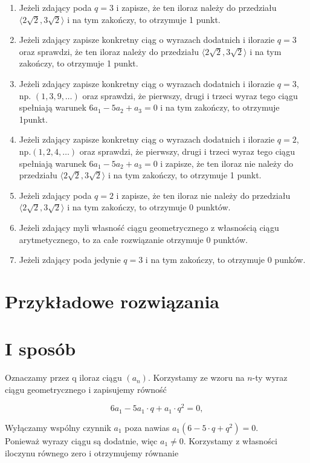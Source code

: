 \documentclass[10pt]{article}
\begin{document}
\begin{enumerate}
  \item Jeżeli zdający poda $q=3$ i zapisze, że ten iloraz należy do przedziału $\langle 2 \sqrt{2}, 3 \sqrt{2}\rangle$ i na tym zakończy, to otrzymuje 1 punkt.
  \item Jeżeli zdający zapisze konkretny ciąg o wyrazach dodatnich i ilorazie $q=3$ oraz sprawdzi, że ten iloraz należy do przedziału $\langle 2 \sqrt{2}, 3 \sqrt{2}\rangle$ i na tym zakończy, to otrzymuje 1 punkt.
  \item Jeżeli zdający zapisze konkretny ciąg o wyrazach dodatnich i ilorazie $q=3$, np. $(1,3,9, \ldots)$ oraz sprawdzi, że pierwszy, drugi i trzeci wyraz tego ciągu spełniają warunek $6 a_{1}-5 a_{2}+a_{3}=0$ i na tym zakończy, to otrzymuje 1punkt.
  \item Jeżeli zdający zapisze konkretny ciąg o wyrazach dodatnich i ilorazie $q=2$, $\mathrm{np} .(1,2,4, \ldots)$ oraz sprawdzi, że pierwszy, drugi i trzeci wyraz tego ciągu spełniają warunek $6 a_{1}-5 a_{2}+a_{3}=0$ i zapisze, że ten iloraz nie należy do przedziału $\langle 2 \sqrt{2}, 3 \sqrt{2}\rangle$ i na tym zakończy, to otrzymuje 1 punkt.
  \item Jeżeli zdający poda $q=2$ i zapisze, że ten iloraz nie należy do przedziału $\langle 2 \sqrt{2}, 3 \sqrt{2}\rangle$ i na tym zakończy, to otrzymuje 0 punktów.
  \item Jeżeli zdający myli własność ciągu geometrycznego z własnością ciągu arytmetycznego, to za całe rozwiązanie otrzymuje 0 punktów.
  \item Jeżeli zdający poda jedynie $q=3$ i na tym zakończy, to otrzymuje 0 punków.
\end{enumerate}

\section*{Przykładowe rozwiązania}
\section*{I sposób}
Oznaczamy przez q iloraz ciągu $\left(a_{n}\right)$. Korzystamy ze wzoru na $n$-ty wyraz ciągu geometrycznego i zapisujemy równość

$$
6 a_{1}-5 a_{1} \cdot q+a_{1} \cdot q^{2}=0,
$$

Wyłączamy wspólny czynnik $a_{1}$ poza nawias $a_{1}\left(6-5 \cdot q+q^{2}\right)=0$.\\
Ponieważ wyrazy ciągu są dodatnie, więc $a_{1} \neq 0$. Korzystamy z własności iloczynu równego zero i otrzymujemy równanie
\end{document}
